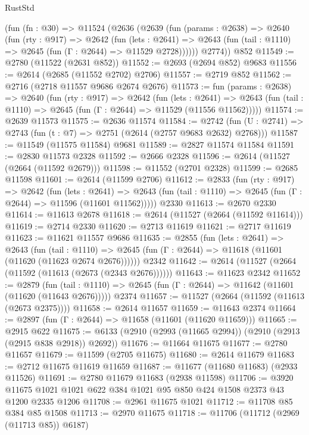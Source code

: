 \begin{lexlean}{RustStd}
\begin{coremodule}
    (fun (fn : @30) =>
    @11524
      (@2636
        (@2639
          (fun (params : @2638) =>
          @2640
            (fun (rty : @917) =>
            @2642
              (fun (lets : @2641) =>
              @2643 (fun (tail : @1110) => @2645 (fun (Γ : @2644) => @11529 @2728))))))
        @2774))
    @852
@11549 := @2780 (@11522 (@2631 @852))
@11552 := @2693 (@2694 @852) @9683
@11556 := @2614 (@2685 (@11552 @2702) @2706)
@11557 := @2719 @852
@11562 := @2716 (@2718 @11557 @9686 @2674 @2676)
@11573 := fun (params : @2638) =>
  @2640
    (fun (rty : @917) =>
    @2642
      (fun (lets : @2641) =>
      @2643 (fun (tail : @1110) => @2645 (fun (Γ : @2644) => @11529 (@11556 @11562)))))
@11574 := @2639 @11573
@11575 := @2636 @11574
@11584 := @2742 (fun (U : @2741) => @2743 (fun (t : @7) => @2751 (@2614 (@2757 @9683 @2632) @2768)))
@11587 := @11549 (@11575 @11584) @9681
@11589 := @2827 @11574 @11584
@11591 := @2830 @11573 @2328
@11592 := @2666 @2328
@11596 := @2614 (@11527 (@2664 (@11592 @2679)))
@11598 := @11552 (@2701 @2328)
@11599 := @2685 @11598
@11601 := @2614 (@11599 @2706)
@11612 := @2833
    (fun (rty : @917) =>
    @2642
      (fun (lets : @2641) =>
      @2643 (fun (tail : @1110) => @2645 (fun (Γ : @2644) => @11596 (@11601 @11562)))))
    @2330
@11613 := @2670 @2330
@11614 := @11613 @2678
@11618 := @2614 (@11527 (@2664 (@11592 @11614)))
@11619 := @2714 @2330
@11620 := @2713 @11619
@11621 := @2717 @11619
@11623 := @11621 @11557 @9686
@11635 := @2855
    (fun (lets : @2641) =>
    @2643
      (fun (tail : @1110) =>
      @2645 (fun (Γ : @2644) => @11618 (@11601 (@11620 (@11623 @2674 @2676))))))
    @2342
@11642 := @2614 (@11527 (@2664 (@11592 (@11613 (@2673 (@2343 @2676))))))
@11643 := @11623 @2342
@11652 := @2879
    (fun (tail : @1110) => @2645 (fun (Γ : @2644) => @11642 (@11601 (@11620 (@11643 @2676)))))
    @2374
@11657 := @11527 (@2664 (@11592 (@11613 (@2673 @2375))))
@11658 := @2614 @11657
@11659 := @11643 @2374
@11664 := @2897 (fun (Γ : @2644) => @11658 (@11601 (@11620 @11659)))
@11665 := @2915 @622
@11675 := @6133 (@2910 (@2993 (@11665 @2994)) (@2910 (@2913 (@2915 @838 @2918)) @2692))
@11676 := @11664 @11675
@11677 := @2780 @11657
@11679 := @11599 (@2705 @11675)
@11680 := @2614 @11679
@11683 := @2712 @11675 @11619 @11659
@11687 := @11677 (@11680 @11683) (@2933 @11526)
@11691 := @2780 @11679 @11683 (@2938 @11598)
@11706 := @3920 @11675 @1021 @1021 @622 @384 @1021 @95 @850 @424 @1508 @2373 @43 @1200 @2335 @1206
@11708 := @2961 @11675 @1021
@11712 := @11708 @85 @384 @85 @1508
@11713 := @2970 @11675
@11718 := @11706 (@11712 (@2969 (@11713 @85)) @6187)

\end{coremodule}
\end{lexlean}

